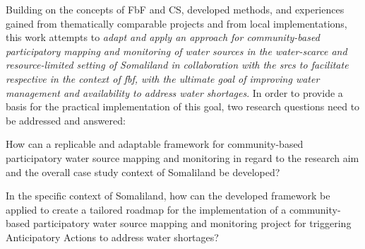 Building on the concepts of FbF and CS, developed methods, and experiences gained from thematically comparable projects and from local implementations, this work attempts to \textit{adapt and apply an approach for community-based participatory mapping and monitoring of water sources in the water-scarce and resource-limited setting of Somaliland in collaboration with the \acrshort{srcs} to facilitate respective  in the context of \acrlong{fbf}, with the ultimate goal of improving water management and availability to address water shortages}. In order to provide a basis for the practical implementation of this goal, two research questions need to be addressed and answered:


\begin{questions}
    \item How can a replicable and adaptable framework for community-based participatory water source mapping and monitoring in regard to the research aim and the overall case study context of Somaliland be developed?
    \item In the specific context of Somaliland, how can the developed framework be applied to create a tailored roadmap for the implementation of a community-based participatory water source mapping and monitoring project for triggering Anticipatory Actions to address water shortages?
\end{questions}

